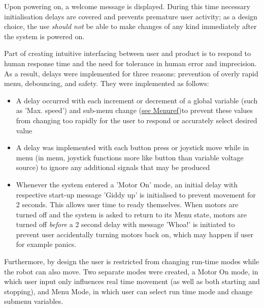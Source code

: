 \documentclass{article}
\begin{document}
	Upon powering on, a welcome message is displayed. During this time necessary initialisation delays are covered and prevents premature user activity; as a design choice, the use \textit{should not} be able to make changes of any kind immediately after the system is powered on.
	
	Part of creating intuitive interfacing between user and product is to respond to human response time and the need for tolerance in human error and imprecision. As a result, delays were implemented for three reasons: prevention of overly rapid menu, debouncing, and safety. They were implemented as follows:
	\begin{itemize}
		\item A delay occurred with each increment or decrement of a global variable (such as 'Max. speed') and sub-menu change (\underline{see Menu\textunderscore ref})to prevent these values from changing too rapidly for the user to respond or accurately select desired value
		\item A delay was implemented with each button press or joystick move while in menu (in menu, joystick functions more like button than variable voltage source) to ignore any additional signals that may be produced
		\item Whenever the system entered a 'Motor On' mode, an initial delay with respective start-up message 'Giddy up' is initialised to prevent movement for 2 seconds. This allows user time to ready themselves. When motors are turned off and the system is asked to return to its Menu state, motors are turned off \textit{before} a 2 second delay with message 'Whoa!' is initiated to prevent user accidentally turning motors back on, which may happen if user for example panics. 
	\end{itemize}
	Furthermore, by design the user is restricted from changing run-time modes while the robot can also move. Two separate modes were created, a Motor On mode, in which user input only influences real time movement (as well as both starting and stopping), and Menu Mode, in which user can select run time mode and change submenu variables.
	

	
\end{document}
